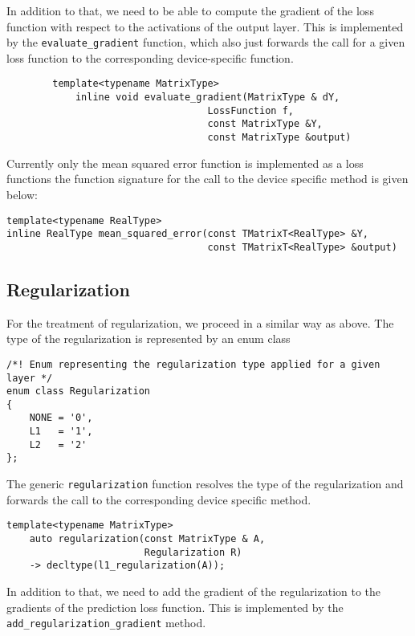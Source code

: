 \documentclass[a4paper,11pt,bibtotoc,xcolor=dvipsnames]{scrartcl}
\newcommand*{\code}[1]{\texttt{#1}}
\begin{document}
In addition to that, we need to be able to compute the gradient of the loss
function with respect to the activations of the output layer. This is
implemented by the \code{evaluate_gradient} function, which also just forwards
the call for a given loss function to the corresponding device-specific function.

\begin{verbatim}
        template<typename MatrixType>
            inline void evaluate_gradient(MatrixType & dY,
                                   LossFunction f,
                                   const MatrixType &Y,
                                   const MatrixType &output)
\end{verbatim}

Currently only the mean squared error function is implemented as a loss functions
the function signature for the call to the device specific method is given below:

\begin{verbatim}
template<typename RealType>
inline RealType mean_squared_error(const TMatrixT<RealType> &Y,
                                   const TMatrixT<RealType> &output)
\end{verbatim}

\subsection{Regularization}

For the treatment of regularization, we proceed in a similar way as above. The type
of the regularization is represented by an enum class

\begin{verbatim}
/*! Enum representing the regularization type applied for a given layer */
enum class Regularization
{
    NONE = '0',
    L1   = '1',
    L2   = '2'
};
\end{verbatim}

The generic \code{regularization} function resolves the type of the regularization
and forwards the call to the corresponding device specific method.

\begin{verbatim}
template<typename MatrixType>
    auto regularization(const MatrixType & A,
                        Regularization R)
    -> decltype(l1_regularization(A));
\end{verbatim}

In addition to that, we need to add the gradient of the regularization to the
gradients of the prediction loss function. This is implemented by the
\code{add_regularization_gradient} method.
\end{document}
